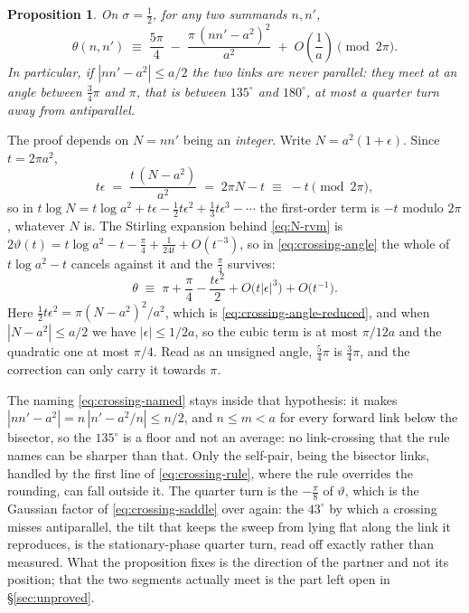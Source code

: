 \documentclass[11pt]{article}
\newtheorem{proposition}[theorem]{Proposition}
\theoremstyle{definition}
\begin{document}
\begin{proposition}\label{prop:crossing-angle}
On $\sigma=\tfrac12$, for any two summands $n,n'$,
\begin{equation}\label{eq:crossing-angle-reduced}
\theta(n,n')
\;\equiv\;
\frac{5\pi}{4}\;-\;\frac{\pi\,(nn'-a^{2})^{2}}{a^{2}}
\;+\;O\!\left(\frac1a\right)
\pmod{2\pi}.
\end{equation}
In particular, if $|nn'-a^{2}|\leq a/2$ the two links are never parallel: they
meet at an angle between $\tfrac34\pi$ and $\pi$, that is between $135^{\circ}$
and $180^{\circ}$, at most a quarter turn away from antiparallel.
\end{proposition}

The proof depends on $N=nn'$ being an \emph{integer}. Write $N=a^{2}(1+\epsilon)$.
Since $t=2\pi a^{2}$,
\begin{equation}\label{eq:crossing-angle-integrality}
t\epsilon\;=\;\frac{t\,(N-a^{2})}{a^{2}}\;=\;2\pi N-t\;\equiv\;-t\pmod{2\pi},
\end{equation}
so in
$t\log N=t\log a^{2}+t\epsilon-\tfrac12t\epsilon^{2}+\tfrac13t\epsilon^{3}-\cdots$
the first-order term is $-t$ modulo $2\pi$, whatever $N$ is. The Stirling
expansion behind \eqref{eq:N-rvm} is
$2\vartheta(t)=t\log a^{2}-t-\tfrac{\pi}{4}+\tfrac{1}{24t}+O(t^{-3})$, so in
\eqref{eq:crossing-angle} the whole of $t\log a^{2}-t$ cancels against it and
the $\tfrac\pi4$ survives:
\[
\theta\;\equiv\;\pi+\frac{\pi}{4}-\frac{t\epsilon^{2}}{2}
+O\bigl(t|\epsilon|^{3}\bigr)+O\bigl(t^{-1}\bigr).
\]
Here $\tfrac12t\epsilon^{2}=\pi(N-a^{2})^{2}/a^{2}$, which is \eqref{eq:crossing-angle-reduced},
and when $|N-a^{2}|\leq a/2$ we have $|\epsilon|\leq1/2a$, so the cubic term is
at most $\pi/12a$ and the quadratic one at most $\pi/4$. Read as an unsigned
angle, $\tfrac54\pi$ is $\tfrac34\pi$, and the correction can only carry it
towards $\pi$.

The naming \eqref{eq:crossing-named} stays inside that hypothesis: it makes
$|nn'-a^{2}|=n\,|n'-a^{2}/n|\leq n/2$, and $n\leq m<a$ for every forward link
below the bisector, so the $135^{\circ}$ is a floor and not an average: no
link-crossing that the rule names can be sharper than that. Only the
self-pair, being the bisector links, handled by the first line of
\eqref{eq:crossing-rule}, where the rule overrides the rounding, can fall
outside it. The quarter turn is the
$-\tfrac\pi8$ of $\vartheta$, which is the Gaussian factor of
\eqref{eq:crossing-saddle} over again: the $43^{\circ}$ by which a crossing
misses antiparallel, the tilt that keeps the sweep from lying flat along the
link it reproduces, is the stationary-phase quarter turn, read off exactly
rather than measured. What the proposition fixes is the direction of the
partner and not its position; that the two segments actually meet is the part
left open in \S\ref{sec:unproved}.
\end{document}
